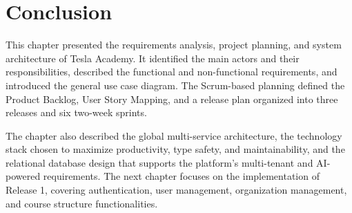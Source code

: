 \section*{Conclusion}

This chapter presented the requirements analysis, project planning, and system architecture
of Tesla Academy. It identified the main actors and their responsibilities, described the
functional and non-functional requirements, and introduced the general use case diagram.
The Scrum-based planning defined the Product Backlog, User Story Mapping, and a release
plan organized into three releases and six two-week sprints.

The chapter also described the global multi-service architecture, the technology stack
chosen to maximize productivity, type safety, and maintainability, and the relational
database design that supports the platform's multi-tenant and AI-powered requirements.
The next chapter focuses on the implementation of Release 1, covering authentication,
user management, organization management, and course structure functionalities.